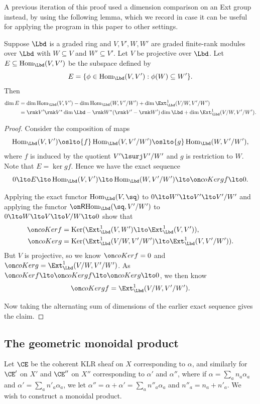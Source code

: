 \documentclass[11pt,reqno]{amsart}
\begin{document}
\begin{remark}
    A previous iteration of this proof used a dimension comparison on an Ext group instead, by using the following lemma, which we record in case it can be useful for applying the program in this paper to other settings.
    \begin{lemma}\label{lem:dimlemma}
    Suppose $\Lbd$ is a graded ring and $V,V',W,W'$ are graded finite-rank modules over $\Lbd$ with $W\subseteq V$ and $W'\subseteq V'$. Let $V$ be projective over $\Lbd$. Let $E\subseteq \hom_\Lbd(V,V')$ be the subspace defined by
    \[E=\{\phi\in\hom_\Lbd(V,V'): \phi(W)\subseteq W'\}.\] 
    Then
    \begin{align*}
        \dim E&=\dim \hom_\Lbd(V,V')-\dim\hom_\Lbd(W,V'/W')+\dim\Ext_\Lbd^1(V/W,V'/W')\\
        &=\rnk V' \rnk V^* \dim\Lbd- \rnk W^*(\rnk V'-\rnk W')\dim\Lbd+\dim\Ext_\Lbd^1(V/W,V'/W').
    \end{align*}
\end{lemma}
\begin{proof}
    Consider the composition of maps
    \[\hom_\Lbd(V,V')\oslto{f} \hom_\Lbd(V,V'/W')\oslto{g} \hom_\Lbd(W,V'/W'),\] 
    where $f$ is induced by the quotient $V'\lsurj V'/W'$ and $g$ is restriction to $W$. Note that $E=\ker gf$. Hence we have the exact sequence
    \[0\lto E\lto \hom_\Lbd(V,V')\lto \hom_\Lbd(W,V'/W')\lto \coker gf\lto 0.\] 

    Applying the exact functor $\hom_\Lbd(V,\sq)$ to $0\lto W'\lto V'\lto V'/W'$ and applying the functor $\rhom_\Lbd(\sq,V'/W')$ to $0\lto W\lto V\lto V/W\lto 0$ show that 
    \begin{align*}
        \coker f&=\ker(\Ext_\Lbd^1(V,W')\lto \Ext_\Lbd^1(V,V')),\\
        \coker g&=\ker(\Ext_\Lbd^1(V/W,V'/W')\lto \Ext_\Lbd^1(V,V'/W')).
    \end{align*} 
    But $V$ is projective, so we know $\coker f=0$ and $\coker g=\Ext_\Lbd^1(V/W,V'/W')$. As $\coker f\lto \coker gf\lto \coker g\lto 0$, we then know
    \[\coker gf=\Ext_\Lbd^1(V/W,V'/W').\]

    Now taking the alternating sum of dimensions of the earlier exact sequence gives the claim.
\end{proof}
\end{remark}


\subsection{The geometric monoidal product}\label{sec:geometric monoidal}
Let $\CE$ be the coherent KLR sheaf on $X$ corresponding to $\alpha$, and similarly for $\CE'$ on $X'$ and $\CE''$ on $X''$ corresponding to $\alpha'$ and $\alpha''$, where if $\alpha=\sum_a n_a\alpha_a$ and $\alpha'=\sum_a n'_a\alpha_a$, we let $\alpha''=\alpha+\alpha'=\sum_a n''_a\alpha_a$ and $n''_a=n_a+n'_a.$ We wish to construct a monoidal product.
\end{document}
